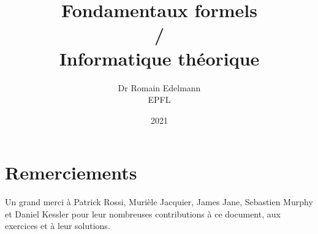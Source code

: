 \documentclass[12pt,french,a4paper]{memoir}
\begin{document}
\title{Fondamentaux formels\\/\\Informatique théorique}
\author{Dr Romain Edelmann\\EPFL}
\date{2021}
\maketitle

\frontmatter

\chapter*{Remerciements}

Un grand merci à Patrick Rossi, Murièle Jacquier, James Jane, Sebastien Murphy et Daniel Kessler pour leur nombreuses contributions à ce document, aux exercices et à leur solutions.

\newpage

\tableofcontents

\mainmatter
















\end{document}
